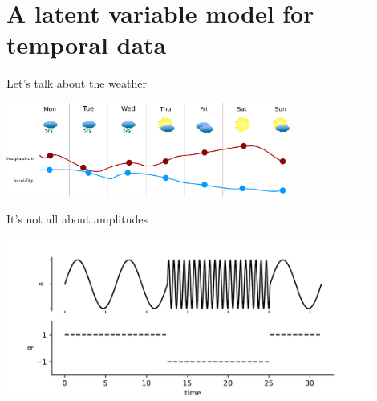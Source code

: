 \section{A latent variable model for temporal data}


\begin{frame}{Let's talk about the weather}

\svspace{-5mm}

\begin{center}
	\includegraphics[width=0.7\textwidth]{img/weather}
\end{center}

\begin{center}
\end{center}

\end{frame}

\begin{frame}{It's not all about amplitudes}

\begin{center}
	\includegraphics[width=0.9\textwidth]{img/sin}
\end{center}


\end{frame}

